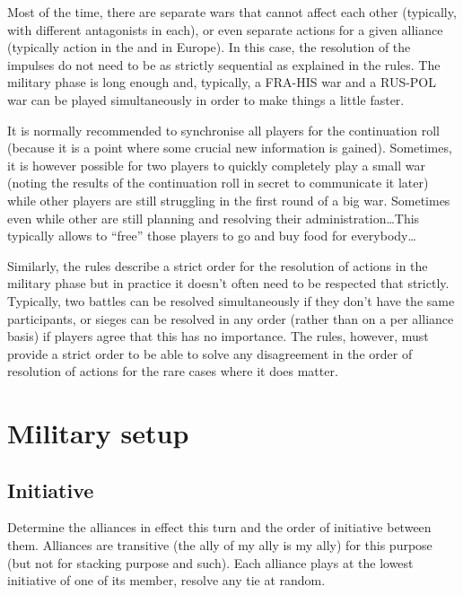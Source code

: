 \begin{playtip}[Simultaneity]
  Most of the time, there are separate wars that cannot affect each other
  (typically, with different antagonists in each), or even separate actions
  for a given alliance (typically action in the \ROTW and in Europe). In this
  case, the resolution of the impulses do not need to be as strictly
  sequential as explained in the rules. The military phase is long enough and,
  typically, a FRA-HIS war and a RUS-POL war can be played simultaneously in
  order to make things a little faster.

  It is normally recommended to synchronise all players for the continuation
  roll (because it is a point where some crucial new information is
  gained). Sometimes, it is however possible for two players to quickly
  completely play a small war (noting the results of the continuation roll in
  secret to communicate it later) while other players are still struggling in
  the first round of a big war. Sometimes even while other are still planning
  and resolving their administration\ldots This typically allows to ``free''
  those players to go and buy food for everybody\ldots

  \smallskip

  Similarly, the rules describe a strict order for the resolution of actions
  in the military phase but in practice it doesn't often need to be respected
  that strictly. Typically, two battles can be resolved simultaneously if they
  don't have the same participants, or sieges can be resolved in any order
  (rather than on a per alliance basis) if players agree that this has no
  importance. The rules, however, must provide a strict order to be able to
  solve any disagreement in the order of resolution of actions for the rare
  cases where it does matter.
\end{playtip}

\section{Military setup}
\label{chMilitary:Military setup}
\subsection{Initiative}
Determine the alliances in effect this turn and the order of initiative
between them. Alliances are transitive (the ally of my ally is my ally) for
this purpose (but not for stacking purpose and such). Each alliance plays at
the lowest initiative of one of its member, resolve any tie at random.

